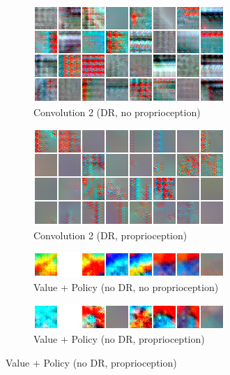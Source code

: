 \begin{figure}
  \begin{subfigure}{0.49\textwidth}
    \includegraphics[width=\textwidth]{figures/chapter6/act_max/jaco_dr_noprop_conv2}
    \caption{Convolution 2 (DR, no proprioception)}
  \end{subfigure}
  \begin{subfigure}{0.49\textwidth}
    \includegraphics[width=\textwidth]{figures/chapter6/act_max/jaco_dr_prop_conv2}
    \caption{Convolution 2 (DR, proprioception)}
  \end{subfigure}

  \begin{subfigure}{0.49\textwidth}
    \includegraphics[width=\textwidth]{figures/chapter6/act_max/jaco_nodr_noprop_value_policy}
    \caption{Value + Policy (no DR, no proprioception)}
  \end{subfigure}
  \begin{subfigure}{0.49\textwidth}
    \includegraphics[width=\textwidth]{figures/chapter6/act_max/jaco_nodr_prop_value_policy}
    \caption{Value + Policy (no DR, proprioception)}
  \end{subfigure}


\end{figure}
